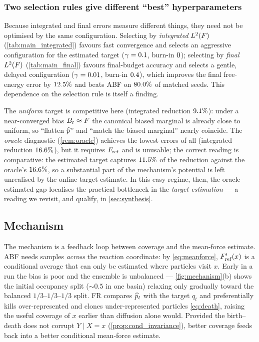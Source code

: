 \subsubsection{Two selection rules give different ``best'' hyperparameters}
\label{sec:selection}
Because integrated and final errors measure different things, they need not be
optimised by the same configuration. Selecting by \emph{integrated} $L^2(F)$
(\cref{tab:main_integrated}) favours fast convergence and selects an aggressive
configuration for the estimated target ($\gamma=0.1$, burn-in
$0$); selecting by \emph{final} $L^2(F)$ (\cref{tab:main_final})
favours final-budget accuracy and selects a gentle, delayed configuration
($\gamma=0.01$, burn-in $0.4$), which improves the final
free-energy error by $12.5\%$ and beats ABF on $80.0\%$ of
matched seeds. This dependence on the selection rule is itself a finding.



The \emph{uniform} target is competitive here (integrated reduction
$9.1\%$): under a near-converged bias $B_t\approx F$ the canonical
biased marginal is already close to uniform, so ``flatten $\widehat{p}$'' and ``match
the biased marginal'' nearly coincide. The \emph{oracle} diagnostic
(\cref{rem:oracle}) achieves the lowest errors of all (integrated reduction
$16.6\%$), but it requires $F_{\mathrm{ref}}$ and is unusable; the correct
reading is comparative: the estimated target captures $11.5\%$ of the
reduction against the oracle's $16.6\%$, so a substantial part of the
mechanism's potential is left unrealised by the online target estimate. In this
easy regime, then, the oracle--estimated gap localises the practical bottleneck
in the \emph{target estimation} --- a reading we revisit, and qualify, in
\cref{sec:synthesis}.

\subsection{Mechanism}
\label{sec:mechanism}
The mechanism is a feedback loop between coverage and the mean-force estimate.
ABF needs samples \emph{across} the reaction coordinate: by
\eqref{eq:meanforce}, $F'_{\mathrm{ref}}(x)$ is a conditional average that can only be
estimated where particles visit $x$. Early in a run the bias is poor and the
ensemble is unbalanced --- \cref{fig:mechanism}(b) shows the initial occupancy
split ($\sim\!0.5$ in one basin) relaxing only gradually toward the balanced
$1/3$--$1/3$--$1/3$ split. FR compares $\widehat{p}_t$ with the target $q_t$ and
preferentially kills over-represented and clones under-represented particles
\eqref{eq:death}, raising the useful coverage of $x$ earlier than diffusion
alone would. Provided the birth--death does not corrupt $Y\mid X=x$
(\cref{prop:cond_invariance}), better coverage feeds back into a better
conditional mean-force estimate.

